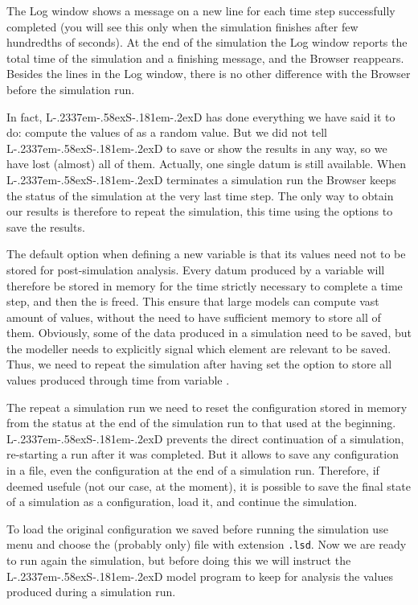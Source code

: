 \documentclass [11pt,a4paper] {book}
\def\LsD{{L\kern-.2337em\lower-.58ex\hbox{S}\kern-.181em\lower-.2ex\hbox{D}}\xspace}
\begin{document}
The Log window shows a message on a new line for each time step successfully completed (you will see
this only when the simulation finishes after few hundredths of seconds). At the end of
the simulation the Log window reports the total time of the simulation and a finishing
message, and the Browser reappears. Besides the lines in the Log window, there is no
other difference with the Browser before the simulation run.

In fact, \LsD has done everything we have said it to do: compute the values of  as a
random value. But we did not tell \LsD to save or show the results in any way, so we have
lost (almost) all of them. Actually, one single datum is still available. When \LsD
terminates a simulation run the Browser keeps the status of the simulation at the very
last time step. The only way to obtain our results is therefore to repeat the simulation,
this time using the options to save the results. 

The default option when defining a new variable is that its values need not to be stored for post-simulation analysis. Every datum produced by a variable will therefore be stored in memory for the time strictly necessary to complete a time step, and then the is freed. This ensure that large models can compute vast amount of values, without the need to have sufficient memory to store all of them. Obviously, some of the data produced in a simulation need to be saved, but the modeller needs to explicitly signal which element are relevant to be saved. Thus, we need to repeat the simulation after having set the option to store all values produced through time from variable .

The repeat a simulation run we need to reset the configuration stored in memory from the status at the end of the simulation run to that used at the beginning. \LsD prevents the direct continuation of a simulation, re-starting a run after it was completed. But it allows to save any configuration in a file, even the configuration at the end of a simulation run. Therefore, if deemed usefule (not our case, at the moment), it is possible to save the final state of a simulation as a configuration, load it, and continue the simulation.

To load the original configuration we saved before running the simulation use menu  and choose
the (probably only) file with extension \verb".lsd". Now we are ready to run again the simulation, but before doing this we will instruct the \LsD model program to keep for analysis the values produced during a simulation run.
\end{document}
